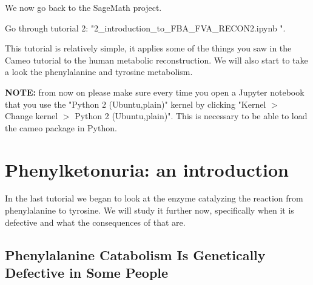 \documentclass{article}
\begin{document}
We now go back to the SageMath project.

\begin{tcolorbox}[width=\textwidth,colback={yellow},title={ASSIGNMENT},coltitle=white]

Go through tutorial 2: "2\_introduction\_to\_FBA\_FVA\_RECON2.ipynb
". \newline

This tutorial is relatively simple, it applies some of the things you saw in the Cameo tutorial to the human metabolic reconstruction. We will also start to take a look the phenylalanine and tyrosine metabolism. \newline

\textbf{NOTE:} from now on please make sure every time you open a Jupyter notebook that you use the "Python 2 (Ubuntu,plain)" kernel by clicking "Kernel $>$ Change kernel $>$ Python 2 (Ubuntu,plain)". This is necessary to be able to load the cameo package in Python.
\end{tcolorbox}

\section{Phenylketonuria: an introduction}
In the last tutorial we began to look at the enzyme catalyzing the reaction from phenylalanine to tyrosine. We will study it further now, specifically when it is defective and what the consequences of that are.

\subsection*{Phenylalanine Catabolism Is Genetically Defective in Some People}
\end{document}

